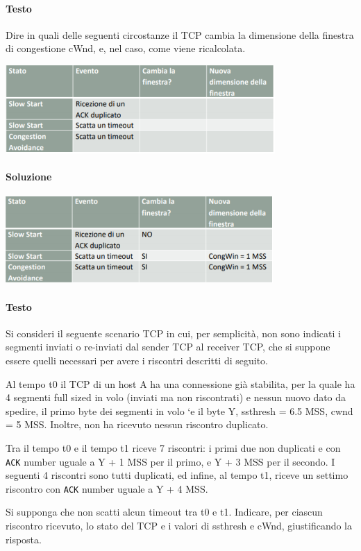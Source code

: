 \documentclass[10pt]{article}
\begin{document}
{\paragraph{Testo} Dire in quali delle seguenti circostanze il TCP cambia la dimensione della finestra di congestione cWnd, e, nel caso, come viene ricalcolata.
\begin{center}
\includegraphics[scale=1]{es_tcp8testo.png}
\end{center}
\paragraph{Soluzione}
\begin{center}
\includegraphics[scale=1]{es_tcp8.png}
\end{center}
\pagebreak
\paragraph{Testo} Si consideri il seguente scenario TCP in cui, per semplicità, non sono indicati i segmenti inviati o re-inviati dal sender TCP al receiver TCP, che si suppone essere quelli necessari per avere i riscontri descritti di seguito.
\begin{list}{-}{}
\item Al tempo t0 il TCP di un host A ha una connessione già stabilita, per la quale ha 4 segmenti full sized in volo (inviati ma non riscontrati) e nessun nuovo dato da spedire, il primo byte dei segmenti in volo `e il byte Y, ssthresh = 6.5 MSS, cwnd = 5 MSS. Inoltre, non ha ricevuto nessun riscontro duplicato.
\item Tra il tempo t0 e il tempo t1 riceve 7 riscontri: i primi due non duplicati e con \texttt{ACK} number uguale a Y + 1 MSS per il primo, e Y + 3 MSS per il secondo. I seguenti 4 riscontri sono tutti duplicati, ed infine, al tempo t1, riceve un settimo riscontro con \texttt{ACK} number uguale a Y + 4 MSS.
\end{list}
Si supponga che non scatti alcun timeout tra t0 e t1. Indicare, per ciascun riscontro ricevuto, lo stato del TCP e i valori di ssthresh e cWnd, giustificando la risposta.
}
\end{document}
